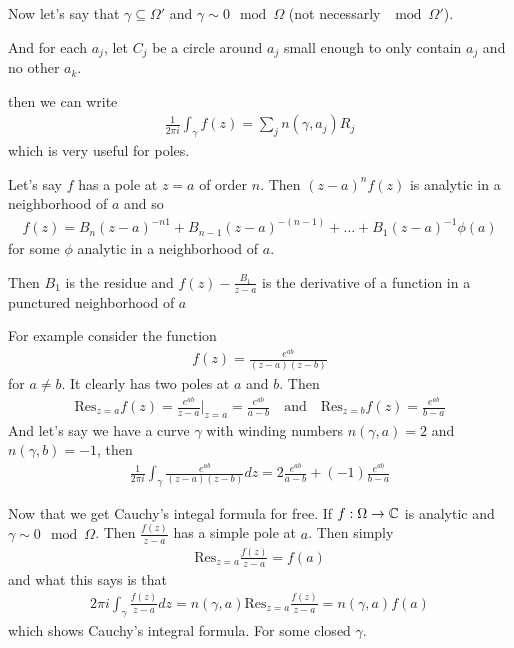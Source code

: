 Now let's say that $\gamma \subseteq \Omega'$ and $\gamma \sim 0 \mod \Omega$ (not necessarly $\mod \Omega'$).

And for each $a_j$, let $C_j$ be a circle around $a_j$ small enough to only contain $a_j$ and no other $a_k$.

then we can write
\begin{align*}
	\frac{1}{2\pi i}\int_{\gamma}f(z) = \sum_{j} n(\gamma,a_j) R_j
\end{align*}
which is very useful for poles.


Let's say $f$ has a pole at $z = a$ of order $n$. Then 
$
(z - a)^{n}f(z)
$
is analytic in a neighborhood of $a$ and so
\begin{align*}
	f(z) = B_n(z-a)^{-n1} + B_{n-1}(z-a)^{-(n-1)} + \ldots + B_1(z-a)^{-1} \phi(a)
\end{align*}
for some $\phi$ analytic in a neighborhood of $a$.

Then $B_1$ is the residue and $f(z) - \frac{B_1}{z-a}$ is the derivative of a function in a punctured neighborhood of $a$

For example consider the function
\begin{align*}
	f(z) = \frac{e^{ab}}{(z-a)(z-b)}
\end{align*}
for $a \neq b$. It clearly has two poles at $a$ and $b$.
Then
\begin{align*}
	\text{Res}_{z = a} f(z) = \frac{e^{ab}}{z-a}|_{z=a} = \frac{e^{ab}}{a-b} \quad \text{and} \quad \text{Res}_{z=b}f(z) = \frac{e^{ab}}{b-a}
\end{align*}
And let's say we have a curve $\gamma$ with winding numbers $n(\gamma,a) = 2$ and $n(\gamma,b) = -1$, then
\begin{align*}
		\frac{1}{2\pi i}\int_{\gamma}\frac{e^{ab}}{(z-a)(z-b)}dz
	=
	2 \frac{e^{ab}}{a-b} + (-1)\frac{e^{ab}}{b-a}
\end{align*}

Now that we get Cauchy's integal formula for free. If $f: \Omega \to \mathbb{C}$ is analytic and $\gamma \sim 0 \mod \Omega$. Then 
$
\frac{f(z)}{z-a}
$
has a simple pole at $a$. Then simply
\begin{align*}
	\text{Res}_{z=a}\frac{f(z)}{z-a} = f(a)
\end{align*}
and what this says is that
\begin{align*}
	2\pi i \int_{\gamma}\frac{f(z)}{z-a}dz = n(\gamma,a) \text{Res}_{z=a}\frac{f(z)}{z-a} = n(\gamma,a) f(a)
\end{align*}
which shows Cauchy's integral formula. For some closed $\gamma$.


